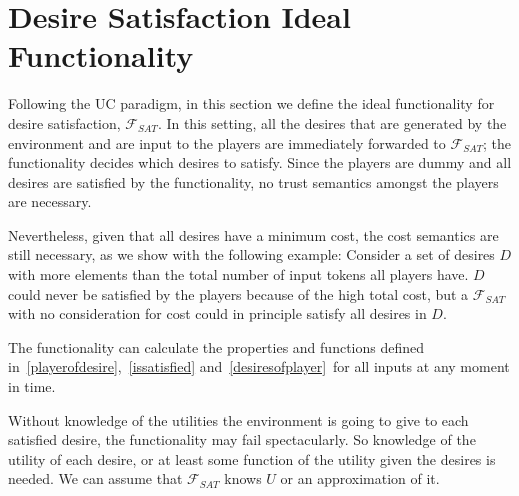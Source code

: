 \section{Desire Satisfaction Ideal Functionality}
  Following the UC paradigm, in this section we define the ideal functionality for desire satisfaction, $\mathcal{F}_{SAT}$.
  In this setting, all the desires that are generated by the environment and are input to the players are immediately forwarded
  to $\mathcal{F}_{SAT}$; the functionality decides which desires to satisfy. Since the players are dummy and all desires are
  satisfied by the functionality, no trust semantics amongst the players are necessary.
  
  Nevertheless, given that all desires have a minimum cost, the cost semantics are still necessary, as we show with the
  following example: Consider a set of desires $D$ with more elements than the total number of input tokens all players have.
  $D$ could never be satisfied by the players because of the high total cost, but a $\mathcal{F}_{SAT}$ with no consideration
  for cost could in principle satisfy all desires in $D$.

  The functionality can calculate the properties and functions defined in~\ref{playerofdesire},~\ref{issatisfied}
  and~\ref{desiresofplayer}\ for all inputs at any moment in time.

  Without knowledge of the utilities the environment is going to give to each satisfied desire, the functionality may fail
  spectacularly. So knowledge of the utility of each desire, or at least some function of the utility given the desires is
  needed. We can assume that $\mathcal{F}_{SAT}$ knows $U$ or an approximation of it.
